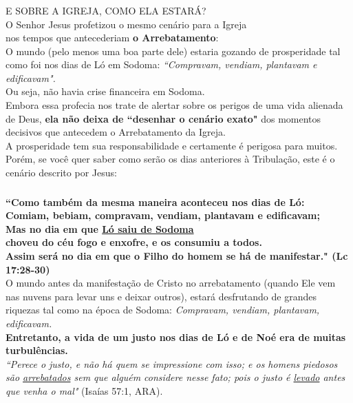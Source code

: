 \documentclass[aspectratio=169]{beamer}
\begin{document}
	



\begin{frame}
	  \frametitle{}
	  \framesubtitle{}
	  \centering
	  {\Large E SOBRE A IGREJA, COMO ELA ESTARÁ?}\\
    O Senhor Jesus profetizou o mesmo cenário para a Igreja\\
    nos tempos que antecederiam \textbf{o Arrebatamento}: \\
			\vspace{.5cm}
	O mundo (pelo menos uma boa parte dele) estaria gozando de prosperidade tal como foi nos dias de Ló em Sodoma:
	\textit{``Compravam, vendiam, plantavam e edificavam".}\\
	Ou seja, não havia crise financeira em Sodoma.\\
	\vspace{.5cm}
	Embora essa profecia nos trate de alertar sobre os perigos de uma vida alienada de Deus, \textbf{\textbf{ela não deixa de ``desenhar o cenário exato"}} dos momentos decisivos que antecedem o Arrebatamento da Igreja.\\ 
		\vspace{.5cm}
	A prosperidade tem sua responsabilidade e certamente é perigosa para muitos. \\
	Porém, se você quer saber como serão os dias anteriores à Tribulação, este é o cenário descrito por Jesus:\\
	\end{frame}


\begin{frame}
  \frametitle{}
  \framesubtitle{}
  \centering
\textbf{``Como também da mesma maneira aconteceu nos dias de Ló:\\Comiam, bebiam, compravam, vendiam, plantavam e edificavam;\\ Mas no dia em que \underline{Ló saiu de Sodoma}\\choveu do céu fogo e enxofre, e os consumiu a todos.\\ 
Assim será no dia em que o Filho do homem se há de manifestar." (Lc 17:28-30)}\\
\vspace{.5cm}
	O mundo antes da manifestação de Cristo no arrebatamento (quando Ele vem nas nuvens para levar uns e deixar outros), estará desfrutando de grandes riquezas tal como na época de Sodoma: \textit{Compravam, vendiam, plantavam, edificavam.} \\
	\vspace{.5cm}
\textbf{	Entretanto, a vida de um justo nos dias de Ló e de Noé era de muitas turbulências.}\\
\textit{``Perece o justo, e não há quem se impressione com isso; e os homens piedosos são \underline{arrebatados} sem que alguém considere nesse fato; pois o justo é \underline{levado} antes que venha o mal"} (Isaías 57:1, ARA).
\end{frame}
\end{document}
